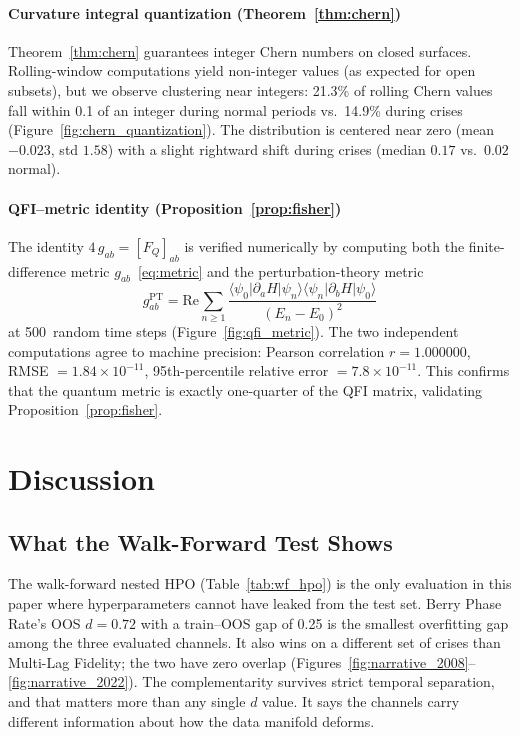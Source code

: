 \documentclass[3p]{elsarticle}
\begin{document}
\paragraph{Curvature integral quantization (Theorem~\ref{thm:chern})}
Theorem~\ref{thm:chern} guarantees integer Chern numbers on closed
surfaces.  Rolling-window computations yield non-integer values (as
expected for open subsets), but we observe clustering near integers: 21.3\%
of rolling Chern values fall within 0.1 of an integer during normal
periods vs.\ 14.9\% during crises
(Figure~\ref{fig:chern_quantization}).  The distribution is centered near
zero (mean $-0.023$, std $1.58$) with a slight rightward shift during
crises (median $0.17$ vs.\ $0.02$ normal).

\paragraph{QFI--metric identity (Proposition~\ref{prop:fisher})}
The identity $4\,g_{ab} = [F_Q]_{ab}$ is verified numerically by
computing both the finite-difference metric
$g_{ab}$~\eqref{eq:metric} and the perturbation-theory metric
\begin{equation}\label{eq:gab_pt}
  g_{ab}^{\text{PT}}
  = \mathrm{Re}\sum_{n \geq 1}
    \frac{\langle\psi_0|\partial_a H|\psi_n\rangle
          \langle\psi_n|\partial_b H|\psi_0\rangle}
         {(E_n - E_0)^2}
\end{equation}
at 500~random time steps (Figure~\ref{fig:qfi_metric}).  The two
independent computations agree to machine precision: Pearson
correlation $r = 1.000000$, RMSE $= 1.84 \times 10^{-11}$,
95th-percentile relative error $= 7.8 \times 10^{-11}$.  This confirms that the quantum
metric is exactly one-quarter of the QFI matrix, validating
Proposition~\ref{prop:fisher}.

\section{Discussion}\label{sec:discussion}

\subsection{What the Walk-Forward Test Shows}

The walk-forward nested HPO (Table~\ref{tab:wf_hpo}) is the only
evaluation in this paper where hyperparameters cannot have leaked
from the test set.  Berry Phase Rate's OOS $d = 0.72$ with a
train--OOS gap of 0.25 is the smallest overfitting gap among the
three evaluated channels.  It also wins on a different set of crises
than Multi-Lag Fidelity; the two have zero overlap
(Figures~\ref{fig:narrative_2008}--\ref{fig:narrative_2022}).
The complementarity survives strict temporal separation, and that
matters more than any single $d$ value.  It says the channels carry
different information about how the data manifold deforms.
\end{document}

